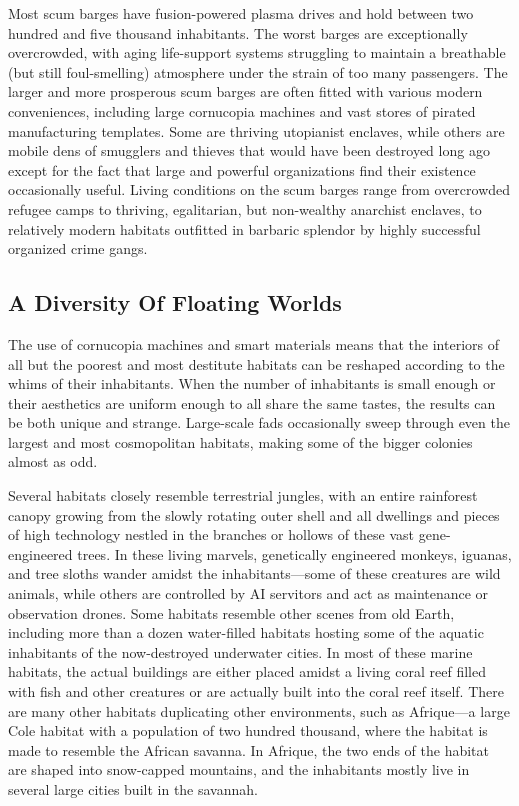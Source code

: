 Most scum barges have fusion-powered plasma 
drives and hold between two hundred and five 
thousand inhabitants. The worst barges are exceptionally
overcrowded, with aging life-support systems
struggling to maintain a breathable (but still
foul-smelling) atmosphere under the strain of too 
many passengers. The larger and more prosperous 
scum barges are often fitted with various modern 
conveniences, including large cornucopia machines 
and vast stores of pirated manufacturing templates. 
Some are thriving utopianist enclaves, while others 
are mobile dens of smugglers and thieves that would 
have been destroyed long ago except for the fact that 
large and powerful organizations find their existence 
occasionally useful. Living conditions on the scum 
barges range from overcrowded refugee camps to 
thriving, egalitarian, but non-wealthy anarchist 
enclaves, to relatively modern habitats outfitted in 
barbaric splendor by highly successful organized 
crime gangs.

\subsection{A Diversity Of Floating Worlds}

The use of cornucopia machines and smart materials 
means that the interiors of all but the poorest and 
most destitute habitats can be reshaped according 
to the whims of their inhabitants. When the number 
of inhabitants is small enough or their aesthetics are 
uniform enough to all share the same tastes, the results
can be both unique and strange. Large-scale fads
occasionally sweep through even the largest and most 
cosmopolitan habitats, making some of the bigger 
colonies almost as odd.

Several habitats closely resemble terrestrial jungles, 
with an entire rainforest canopy growing from the 
slowly rotating outer shell and all dwellings and 
pieces of high technology nestled in the branches 
or hollows of these vast gene-engineered trees. In 
these living marvels, genetically engineered monkeys, 
iguanas, and tree sloths wander amidst the inhabitants—some
of these creatures are wild animals,
while others are controlled by AI servitors and act 
as maintenance or observation drones. Some habitats
resemble other scenes from old Earth, including
more than a dozen water-filled habitats hosting some 
of the aquatic inhabitants of the now-destroyed 
underwater cities. In most of these marine habitats, 
the actual buildings are either placed amidst a living 
coral reef filled with fish and other creatures or are 
actually built into the coral reef itself. There are 
many other habitats duplicating other environments, 
such as Afrique—a large Cole habitat with a population
of two hundred thousand, where the habitat is
made to resemble the African savanna. In Afrique, 
the two ends of the habitat are shaped into snow-capped
mountains, and the inhabitants mostly live in
several large cities built in the savannah.

